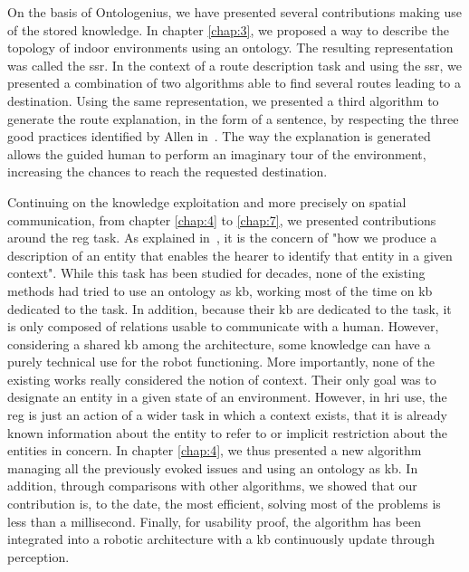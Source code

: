 On the basis of Ontologenius, we have presented several contributions making use of the stored knowledge. In chapter \ref{chap:3}, we proposed a way to describe the topology of indoor environments using an ontology. The resulting representation was called the \acrfull{ssr}. In the context of a route description task and using the \acrshort{ssr}, we presented a combination of two algorithms able to find several routes leading to a destination. Using the same representation, we presented a third algorithm to generate the route explanation, in the form of a sentence, by respecting the three good practices identified by Allen in~\cite{allen_2000_principles}. The way the explanation is generated allows the guided human to perform an imaginary tour of the environment, increasing the chances to reach the requested destination.

Continuing on the knowledge exploitation and more precisely on spatial communication, from chapter \ref{chap:4} to \ref{chap:7}, we presented contributions around the \acrfull{reg} task. As explained in~\cite{reiter_2000_building}, it is the concern of "how we produce a description of an entity that enables the hearer to identify that entity in a given context". While this task has been studied for decades, none of the existing methods had tried to use an ontology as \acrshort{kb}, working most of the time on \acrshort{kb} dedicated to the task. In addition, because their \acrshort{kb} are dedicated to the task, it is only composed of relations usable to communicate with a human. However, considering a shared \acrshort{kb} among the architecture, some knowledge can have a purely technical use for the robot functioning. More importantly, none of the existing works really considered the notion of context. Their only goal was to designate an entity in a given state of an environment. However, in \acrshort{hri} use, the \acrshort{reg} is just an action of a wider task in which a context exists, that it is already known information about the entity to refer to or implicit restriction about the entities in concern. In chapter \ref{chap:4}, we thus presented a new algorithm managing all the previously evoked issues and using an ontology as \acrshort{kb}. In addition, through comparisons with other algorithms, we showed that our contribution is, to the date, the most efficient, solving most of the problems is less than a millisecond. Finally, for usability proof, the algorithm has been integrated into a robotic architecture with a \acrshort{kb} continuously update through perception.

